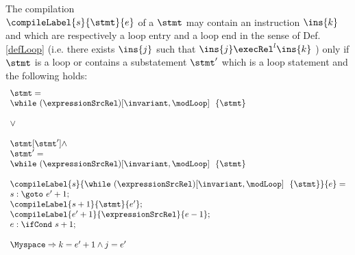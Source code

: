 \begin{compProp4}\label{compile:prop:compProp4}  %
The compilation \\ $\compileLabel{s}{\stmt}{e}$ of a $\stmt$ may contain an instruction $\ins{k}$ and   which are respectively 
a loop entry and a loop end  in the sense of Def.
\ref{defLoop} (i.e. there exists $\ins{j}$ such that $\ins{j} \execRel^{l} \ins{k}$ ) only if  $\stmt$ is a loop or contains 
 a substatement $\stmt'$ which is a loop statement and the following holds:
  $$\begin{array}{l}
                        \stmt = \\             
	                \while \ (\expressionSrcRel) \lbrack \invariant, \modLoop \rbrack \ \do \ \{ \stmt \} \\ \\ 
			\vee \\\\

                        \stmt[\stmt'] \wedge \\
			\stmt' = \\
             
	                \while \ (\expressionSrcRel) \lbrack \invariant, \modLoop \rbrack \ \do \ \{ \stmt \} \\ \\ 

                        \compileLabel{s}{   \while \ (\expressionSrcRel) \lbrack \invariant, \modLoop \rbrack \ \do \ \{ \stmt \}   }{e} = \\
			s: \goto \ e' + 1; \\
	                \compileLabel{s +  1}{\stmt}{e'}; \\
			 \compileLabel{e' +  1}{\expressionSrcRel}{e  -1 };\\
			 e: \ifCond \ s +  1; \\  \\
                        \Myspace \Rightarrow k = e' +1 \wedge j = e'  
                
	           \end{array} 
               $$ 
	   
              
             

\end{compProp4}
 
